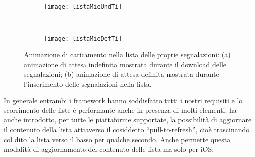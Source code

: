             \begin{figure}[H]
              \centering
              \begin{subfigure}[b]{0.485\textwidth}
                \texttt{[image: listaMieUndTi]}
                \caption{}
              \end{subfigure}
              ~
              \begin{subfigure}[b]{0.485\textwidth}
                \texttt{[image: listaMieDefTi]}
                \caption{}
              \end{subfigure}
              \caption{Animazione di caricamento nella lista delle proprie segnalazioni:
                (a) animazione di attesa indefinita mostrata durante il download delle
                segnalazioni; (b) animazione di attesa definita mostrata durante
                l'inserimento delle segnalazioni nella lista.
                }
              \label{fig:mieLoadTi}
            \end{figure}

            \noindent In generale entrambi i framework hanno soddisfatto tutti
            i nostri requisiti e lo scorrimento delle liste è
            performante anche in presenza di molti elementi. \kendomob{} ha
            anche introdotto, per tutte le piattaforme supportate, la
            possibilità di aggiornare il contenuto della
            lista attraverso il cosiddetto ``pull-to-refresh'', cioè
            trascinando col dito la lista verso il basso per qualche secondo.
            Anche \tisdk{} permette questa modalità di aggiornamento del
            contenuto delle lista ma solo per iOS.

